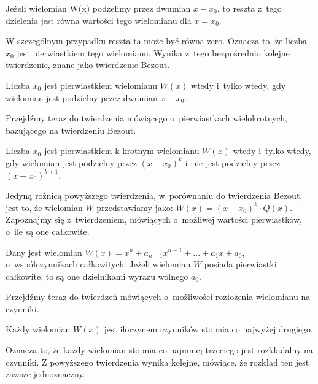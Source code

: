 \begin{theorem}
	$ $\\
	Jeżeli wielomian W(x) podzelimy przez dwumian $x - x_0$, to reszta z~tego dzielenia jest równa wartości tego wielomianu dla $x = x_0$.
\end{theorem}

W szczególnym przypadku reszta ta może być równa zero. Oznacza to, że liczba $x_0$ jest pierwiastkiem tego wielomianu. Wynika z~tego bezpośrednio kolejne twierdzenie, znane jako twierdzenie Bezout.

\begin{theorem}[Bezout]
	$ $\\
	Liczba $x_0$ jest pierwiastkiem wielomianu $W(x)$ wtedy i~tylko wtedy, gdy wielomian jest podzielny przez dwumian $x - x_0$.
\end{theorem}

Przejdźmy teraz do twierdzenia mówiącego o~pierwiastkach wielokrotnych, bazującego na twierdzeniu Bezout.

\begin{theorem}
	$ $\\
	Liczba $x_0$ jest pierwiastkiem k-krotnym wielomianu $W(x)$ wtedy i~tylko wtedy, gdy wielomian jest podzielny przez $(x - x_0)^k$ i~nie jest podzielny przez $(x - x_0)^{k+1}$.
\end{theorem}

Jedyną różnicą powyższego twierdzenia, w~porównaniu do twierdzenia Bezout, jest to, że wielomian $W$ przedstawiamy jako: $W(x) = (x-x_0)^k \cdot Q(x)$. Zapoznajmy się z~twierdzeniem, mówiących o~możliwej wartości pierwiastków, o~ile są one całkowite.

\begin{theorem}
	$ $\\
	Dany jest wielomian $W(x) = x^n + a_{n-1}x^{n-1} + ... + a_1x + a_0$, o~współczynnikach całkowitych. Jeżeli wielomian $W$ posiada pierwiastki całkowite, to są one dzielnikami wyrazu wolnego $a_0$.
\end{theorem}

Przejdźmy teraz do twierdzeń mówiących o~możliwości rozłożenia wielomianu na czynniki.

\begin{theorem}
	$ $\\
	Każdy wielomian $W(x)$ jest iloczynem czynników stopnia co najwyżej drugiego.
\end{theorem}

Oznacza to, że każdy wielomian stopnia co najmniej trzeciego jest rozkładalny na czynniki. Z powyższego twierdzenia wynika kolejne, mówiące, że rozkład ten jest zawsze jednoznaczny.

